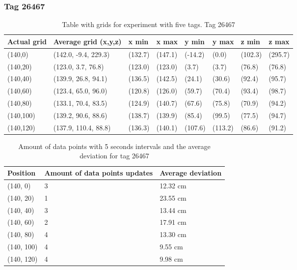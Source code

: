 \subsubsection{Tag 26467}
\begin{table}[H] 
    \centering
    \begin{tabular}{|l|l|l|l|l|l|l|l|}
    \hline
    Actual grid & Average grid (x,y,z)   & x min   & x max   & y min    & y max   & z min   & z max    \\ \hline
    (140,0) 	& (142.0, -9.4, 229.3) 	 & (132.7) 	& (147.1)	& (-14.2)	 & (0.0) 	 & (102.3)	 & (295.7)	\\ \hline
    (140,20)  	& (123.0, 3.7, 76.8) 	 & (123.0) 	& (123.0)	& (3.7)	 & (3.7) 	 & (76.8)	 & (76.8)	\\ \hline
    (140,40)  	& (139.9, 26.8, 94.1) 	 & (136.5) 	& (142.5)	& (24.1)	 & (30.6) 	 & (92.4)	 & (95.7)	\\ \hline
    (140,60)  	& (123.4, 65.0, 96.0) 	 & (120.8) 	& (126.0)	& (59.7)	 & (70.4) 	 & (93.4)	 & (98.7)	\\ \hline
    (140,80)  	& (133.1, 70.4, 83.5) 	 & (124.9) 	& (140.7)	& (67.6)	 & (75.8) 	 & (70.9)	 & (94.2)	\\ \hline
    (140,100)  	& (139.2, 90.6, 88.6) 	 & (138.7) 	& (139.9)	& (85.4)	 & (99.5) 	 & (77.5)	 & (94.7)	\\ \hline
    (140,120)  	& (137.9, 110.4, 88.8) 	 & (136.3) 	& (140.1)	& (107.6)	 & (113.2) 	 & (86.6)	 & (91.2)	\\ \hline
    \end{tabular}
\caption{Table with grids for experiment with five tags. Tag 26467}
\end{table}

\begin{table}[H]
    \centering
    \begin{tabular}{|l|l|l|}
    \hline
    Position   & Amount of data points updates & Average deviation \\ \hline
    (140, 0)   & 3                 &  12.32 cm                 \\ \hline
    (140, 20)  & 1                 &  23.55 cm                 \\ \hline
    (140, 40)  & 3                 &  13.44 cm                 \\ \hline
    (140, 60)  & 2                 &  17.91 cm                 \\ \hline
    (140, 80)  & 4                 &  13.30 cm                \\ \hline
    (140, 100) & 4                 &  9.55 cm                 \\ \hline
    (140, 120) & 4                 &  9.98 cm                 \\ \hline
    \end{tabular}
    \caption{Amount of data points with 5 seconds intervals and the average deviation for tag 26467}
\end{table}

